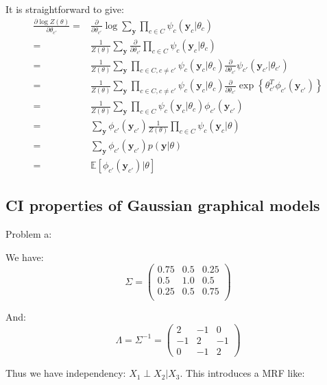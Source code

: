 \documentclass[UTF8]{ctexart}
\begin{document}
It is straightforward to give:
\begin{align}
\frac{\partial \log Z(\theta)}{\partial \theta_{c'}} = &\frac{\partial}{\partial \theta_{c'}}\log \sum_{\textbf{y}}\prod_{c \in C}\psi_{c}(\textbf{y}_{c}|\theta_{c}) \nonumber \\
=&\frac{1}{Z(\theta)}\sum_{\textbf{y}}\frac{\partial}{\partial\theta_{c'}}\prod_{c \in C}\psi_{c}(\textbf{y}_{c}|\theta_{c}) \nonumber \\
=&\frac{1}{Z(\theta)}\sum_{\textbf{y}}\prod_{c \in C,c \neq c'}\psi_{c}(\textbf{y}_{c}|\theta_{c})\frac{\partial}{\partial\theta_{c'}}\psi_{c'}(\textbf{y}_{c'}|\theta_{c'}) \nonumber \\
=&\frac{1}{Z(\theta)}\sum_{\textbf{y}}\prod_{c \in C,c \neq c'}\psi_{c}(\textbf{y}_{c}|\theta_{c})\frac{\partial}{\partial\theta_{c'}} \exp\left\{\theta_{c'}^{T}\phi_{c'}(\textbf{y}_{c'}) \right\} \nonumber \\
=&\frac{1}{Z(\theta)}\sum_{\textbf{y}}\prod_{c \in C}\psi_{c}(\textbf{y}_{c}|\theta_{c})\phi_{c'}(\textbf{y}_{c'}) \nonumber \\
=&\sum_{\textbf{y}}\phi_{c'}(\textbf{y}_{c'})\frac{1}{Z(\theta)}\prod_{c\in C}\psi_{c}(\textbf{y}_{c}|\theta) \nonumber \\
=&\sum_{\textbf{y}}\phi_{c'}(\textbf{y}_{c'})p(\textbf{y}|\theta) \nonumber \\
=&\mathbb{E}[\phi_{c'}(\textbf{y}_{c'})|\theta] \nonumber
\end{align}

\subsection{CI properties of Gaussian graphical models}
Problem a:

We have:
$$\Sigma = \begin{pmatrix} 0.75 & 0.5 & 0.25 \\ 0.5 & 1.0 & 0.5 \\ 0.25 & 0.5 & 0.75 \\ \end{pmatrix}$$

And:
$$\Lambda = \Sigma^{-1} = \begin{pmatrix}2 & -1 & 0 \\-1 & 2 & -1 \\ 0 & -1 & 2 \end{pmatrix}$$

Thus we have independency: $X_{1}\perp X_{2} | X_{3}$. This introduces a MRF like:
\begin{figure}[h]
\small
\centering
{}
\end{figure}
\end{document}
